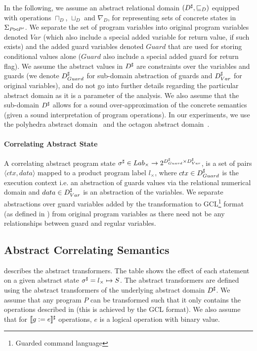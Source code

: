 In the following, we assume an abstract relational domain $(D^\sharp, \sqsubseteq_{D})$ equipped with operations $\sqcap_{D}$, $\sqcup_{D}$ and $\nabla_{D}$, for representing sets of concrete states in $\Sigma_{P \bowtie P'}$. We separate the set of program variables into original program variables denoted $Var$ (which also include a special added variable for return value, if such exists) and the added guard variables denoted $Guard$ that are used for storing conditional values alone ($Guard$ also include a special added guard for return flag). We assume the abstract values in $D^\sharp$ are constraints over the variables and guards (we denote $D^\sharp_{Guard}$ for sub-domain abstraction of guards and $D^\sharp_{Var}$ for original variables), and do not go into further details regarding the particular abstract domain as it is a parameter of the analysis. We also assume that the sub-domain $D^\sharp$ allows for a sound over-approximation of the concrete semantics (given a sound interpretation of program operations). In our experiments, we use the polyhedra abstract domain~\cite{CousotHalbwachs78} and the octagon abstract domain~\cite{Mine2006}.

\paragraph{Correlating Abstract State} 
A correlating abstract program state $\sigma^\sharp \in Lab_{\times} \rightarrow 2^{D^\sharp_{Guard} \times D^\sharp_{Var}}$, is a set of pairs $\langle ctx, data \rangle$ mapped to a product program label $l_{\times}$, where $ctx \in D^\sharp_{Guard}$ is the execution context i.e. an abstraction of guards values via the relational numerical domain and $data \in D^\sharp_{Var}$ is an abstraction of the variables. We separate abstractions over guard variables added by the transformation to GCL\footnote{Guarded command language} format (as defined in ) from original program variables as there need not be any relationships between guard and regular variables.

\subsection{Abstract Correlating Semantics}



 describes the abstract transformers. The table shows the effect of each statement on a given abstract state $\sigma^\sharp = l_{\times} \mapsto S$. The abstract transformers are defined using the abstract transformers of the underlying abstract domain $D^\sharp$. We assume that any program $P$ can be transformed such that it only contains the operations described in  (this is achieved by the GCL format). We also assume that for $\lbrack\!\lbrack g:=e \rbrack\!\rbrack^{\sharp}$ operations, $e$ is a logical operation with binary value.

